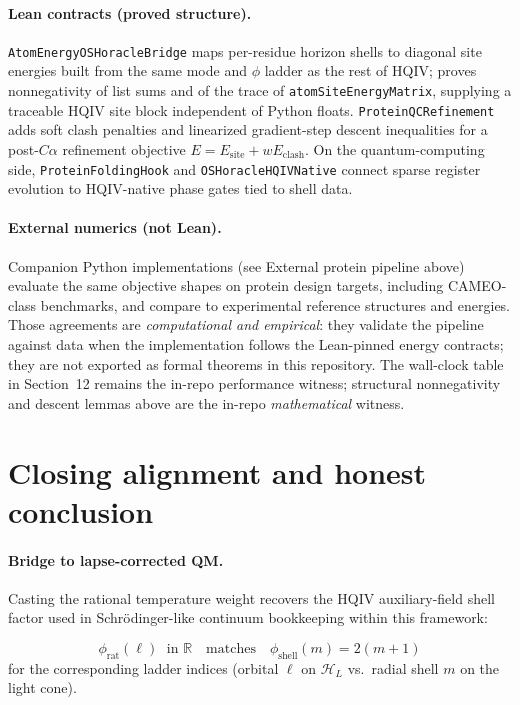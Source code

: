 \documentclass[11pt,a4paper]{article}
\newcommand{\lean}[1]{\path{#1}}
\theoremstyle{remark}
\begin{document}
\paragraph{Lean contracts (proved structure).}
\texttt{AtomEnergyOSHoracleBridge} maps per-residue horizon shells to diagonal site energies built from the same mode and $\phi$ ladder as the rest of HQIV; \lean{ProteinFoldingQuantumChemistry} proves nonnegativity of list sums and of the trace of \texttt{atomSiteEnergyMatrix}, supplying a traceable HQIV site block independent of Python floats. \texttt{ProteinQCRefinement} adds soft clash penalties and linearized gradient-step descent inequalities for a post-$C\alpha$ refinement objective $E=E_{\mathrm{site}}+w E_{\mathrm{clash}}$. On the quantum-computing side, \texttt{ProteinFoldingHook} and \texttt{OSHoracleHQIVNative} connect sparse register evolution to HQIV-native phase gates tied to shell data.

\paragraph{External numerics (not Lean).}
Companion Python implementations (see External protein pipeline above) evaluate the same objective shapes on protein design targets, including CAMEO-class benchmarks, and compare to experimental reference structures and energies. Those agreements are \emph{computational and empirical}: they validate the pipeline against data when the implementation follows the Lean-pinned energy contracts; they are not exported as formal theorems in this repository. The wall-clock table in Section~12 remains the in-repo performance witness; structural nonnegativity and descent lemmas above are the in-repo \emph{mathematical} witness.

\section{Closing alignment and honest conclusion}
\label{sec:closing}

\paragraph{Bridge to lapse-corrected QM.}
Casting the rational temperature weight recovers the HQIV auxiliary-field shell factor used in Schr\"odinger-like continuum bookkeeping within this framework:

\begin{equation}
  \phi_{\mathrm{rat}}(\ell) \;\text{ in }\mathbb{R}
  \quad\text{matches}\quad
  \phi_{\mathrm{shell}}(m)=2(m+1)
\end{equation}
for the corresponding ladder indices (orbital $\ell$ on $\mathcal{H}_L$ vs.\ radial shell $m$ on the light cone).
\end{document}
